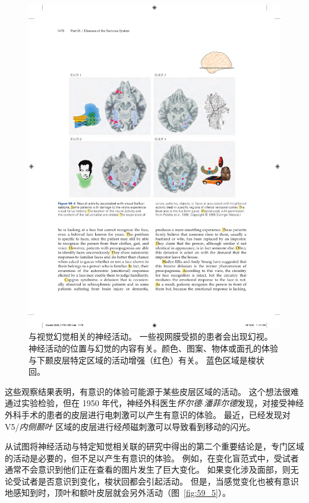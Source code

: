 \begin{figure}[htbp]
	\centering
	\includegraphics[width=0.98\linewidth]{chap59/fig_59_4}
	\caption{与视觉幻觉相关的神经活动。
		一些视网膜受损的患者会出现幻视。
		神经活动的位置与幻觉的内容有关。颜色、图案、物体或面孔的体验与下颞皮层特定区域的活动增强（红色）有关。
		蓝色区域是梭状回\cite{howard1998anatomy}。}
	\label{fig:59_4}
\end{figure}


这些观察结果表明，有意识的体验可能源于某些皮层区域的活动。
这个想法很难通过实验检验，但在 1950 年代，神经外科医生\textit{怀尔德$\cdot$潘菲尔德}发现，对接受神经外科手术的患者的皮层进行电刺激可以产生有意识的体验。
最近，已经发现对 V5/\textit{内侧颞叶} 区域的皮层进行经颅磁刺激可以导致看到移动的闪光。


从试图将神经活动与特定知觉相关联的研究中得出的第二个重要结论是，专门区域的活动是必要的，但不足以产生有意识的体验。
例如，在变化盲范式中，受试者通常不会意识到他们正在查看的图片发生了巨大变化。
如果变化涉及面部，则无论受试者是否意识到变化，梭状回都会引起活动。
但是，当感觉变化也被有意识地感知到时，顶叶和额叶皮层就会另外活动（图~\ref{fig:59_5}）。


